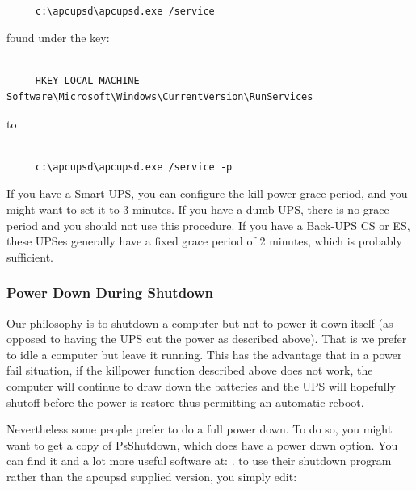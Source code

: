 {{{{{{{{{{\footnotesize
\begin{verbatim}
     
     c:\apcupsd\apcupsd.exe /service
\end{verbatim}
\normalsize

found under the key: 

\footnotesize
\begin{verbatim}
     
     HKEY_LOCAL_MACHINE Software\Microsoft\Windows\CurrentVersion\RunServices
\end{verbatim}
\normalsize

to 

\footnotesize
\begin{verbatim}
     
     c:\apcupsd\apcupsd.exe /service -p
\end{verbatim}
\normalsize

If you have a Smart UPS, you can configure the kill power grace period, and
you might want to set it to 3 minutes. If you have a dumb UPS, there is no
grace period and you should not use this procedure. If you have a Back-UPS CS
or ES, these UPSes generally have a fixed grace period of 2 minutes, which is
probably sufficient. 

\label{Power-Down-During-Shutdown}

\subsubsection*{Power Down During Shutdown}

\label{index-Windows_002c-Power-down-184}
\label{index-Power-down_002c-Windows-185}
Our philosophy is to shutdown a computer but not to power it down itself (as
opposed to having the UPS cut the power as described above). That is we prefer
to idle a computer but leave it running. This has the advantage that in a
power fail situation, if the killpower function described above does not work,
the computer will continue to draw down the batteries and the UPS will
hopefully shutoff before the power is restore thus permitting an automatic
reboot.  

Nevertheless some people prefer to do a full power down. To do so, you might
want to get a copy of PsShutdown, which does have a power down option. You can
find it and a lot more useful software at: 
. to use their shutdown program
rather than the apcupsd supplied version, you simply edit: 

}}}}}}}}}}
